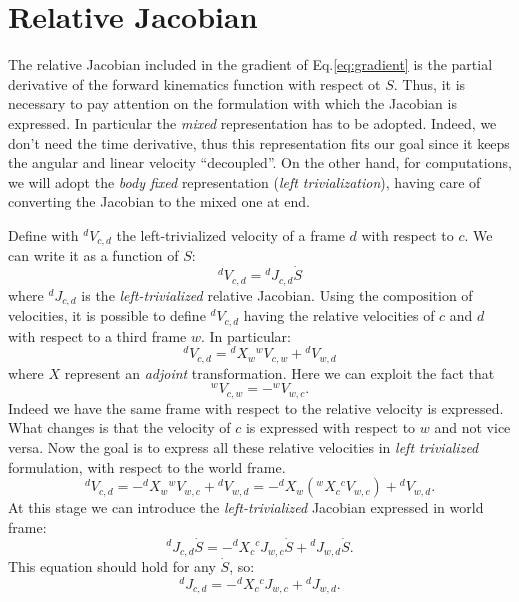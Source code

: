 \section{Relative Jacobian}
The relative Jacobian included in the gradient of Eq.\eqref{eq:gradient} is the partial derivative of the forward kinematics function with respect ot $S$. Thus, it is necessary to pay attention on the formulation with which the Jacobian is expressed. In particular the \textit{mixed} representation has to be adopted. Indeed, we don't need the time derivative, thus this representation fits our goal since it keeps the angular and linear velocity ``decoupled''. On the other hand, for computations, we will adopt the \textit{body fixed} representation (\textit{left trivialization}), having care of converting the Jacobian to the mixed one at end.

Define with ${}^d V_{c,d}$ the left-trivialized velocity of a frame $d$ with respect to $c$. We can write it as a function of $S$:
\begin{equation}
{}^d V_{c,d} = {}^d J_{c,d}\dot{S}
\end{equation}
where ${}^d J_{c,d}$ is the \textit{left-trivialized} relative Jacobian. 
Using the composition of velocities, it is possible to define ${}^d V_{c,d}$ having the relative velocities of $c$ and $d$ with respect to a third frame $w$. In particular:
\begin{equation}
{}^d V_{c,d} = {}^d X_w {}^w V_{c,w} + {}^d V_{w,d}
\end{equation}
where $X$ represent an \textit{adjoint} transformation. Here we can exploit the fact that \begin{equation}
{}^w V_{c,w} = - {}^w V_{w,c}.
\end{equation} 
Indeed we have the same frame with respect to the relative velocity is expressed. What changes is that the velocity of $c$ is expressed with respect to $w$ and not vice versa. Now the goal is to express all these relative velocities in \textit{left trivialized} formulation, with respect to the world frame.
\begin{equation}
{}^d V_{c,d} = -{}^d X_w {}^w V_{w,c} + {}^d V_{w,d} = -{}^d X_w  \left({}^w X_c  {}^cV_{w,c}\right) + {}^d V_{w,d}.
\end{equation}
At this stage we can introduce the \textit{left-trivialized} Jacobian expressed in world frame:
\begin{equation}
{}^d J_{c,d}\dot{S} = -{}^d X_c {}^c J_{w,c}\dot{S} + {}^d J_{w,d}\dot{S}.
\end{equation}
This equation should hold for any $\dot{S}$, so:
\begin{equation}\label{eq:ltjac}
{}^d J_{c,d} = -{}^d X_c {}^c J_{w,c} + {}^d J_{w,d}.
\end{equation}

